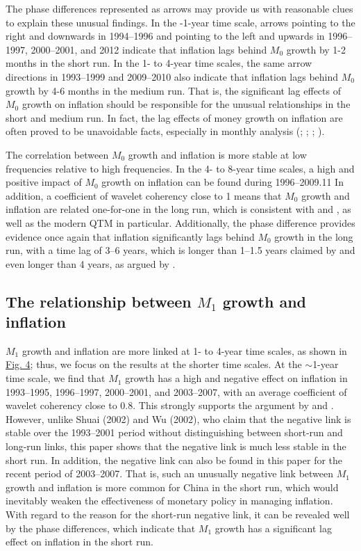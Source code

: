 \documentclass[a4paper,fleqn]{cas-sc}
\begin{document}
The phase differences represented as arrows may provide us with reasonable clues to explain these unusual findings. In the -1-year time scale, arrows pointing to the right and downwards in 1994–1996 and pointing to the left and upwards in 1996–1997, 2000–2001, and 2012 indicate that inflation lags behind $M_0$ growth by 1-2 months in the short run. In the 1- to 4-year time scales, the same arrow directions in 1993–1999 and 2009–2010 also indicate that inflation lags behind $M_0$ growth by 4-6 months in the medium run. That is, the significant lag effects of $M_0$ growth on inflation should be responsible for the unusual relationships in the short and medium run. In fact, the lag effects of money growth on inflation are often proved to be unavoidable facts, especially in monthly analysis (\citealp{friedman1956}; \citealp{meiselman1969}; \citealp{Zhang2008}; \citealp{zhang2009}).

The correlation between $M_0$ growth and inflation is more stable at low frequencies relative to high frequencies. In the 4- to 8-year time scales, a high and positive impact of $M_0$ growth on inflation can be found during 1996–2009.11 In addition, a coefficient of wavelet coherency close to 1 means that $M_0$ growth and inflation are related one-for-one in the long run, which is consistent with \cite*{MacCandless1995} and \cite{Grauwe2005}, as well as the modern QTM in particular. Additionally, the phase difference provides evidence once again that inflation significantly lags behind $M_0$ growth in the long run, with a time lag of 3–6 years, which is longer than 1–1.5 years claimed by \cite{friedman1956} and even longer than 4 years, as argued by \cite*{liukopin2002}.

\subsection{The relationship between \boldmath $M_1$ growth and inflation}
$M_1$ growth and inflation are more linked at 1- to 4-year time scales, as shown in \hyperref[fig:4]{Fig. 4}; thus, we focus on the results at the shorter time scales. At the $\sim$1-year time scale, we find that $M_1$ growth has a high and negative effect on inflation in 1993–1995, 1996–1997, 2000–2001, and 2003–2007, with an average coefficient of wavelet coherency close to $0.8$. This strongly supports the argument by \cite{shuai2002} and \cite{wu2002}. However, unlike Shuai (2002) and Wu (2002), who claim that the negative link is stable over the 1993–2001 period without distinguishing between short-run and long-run links, this paper shows that the negative link is much less stable in the short run. In addition, the negative link can also be found in this paper for the recent period of 2003–2007. That is, such an unusually negative link between $M_1$ growth and inflation is more common for China in the short run, which would inevitably weaken the effectiveness of monetary policy in managing inflation. With regard to the reason for the short-run negative link, it can be revealed well by the phase differences, which indicate that $M_1$ growth has a significant lag effect on inflation in the short run.
\end{document}
